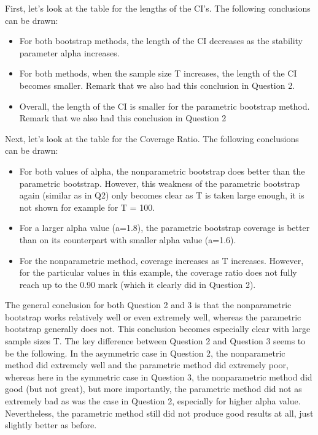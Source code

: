 \documentclass[12pt]{article}
\begin{document}
First, let's look at the table for the lengths of the CI's. The following conclusions can be drawn:
\begin{itemize}
  \item For both bootstrap methods, the length of the CI decreases as the stability parameter alpha increases.
  \item For both methods, when the sample size T increases, the length of the CI becomes smaller. Remark that we also had this conclusion in Question 2.
  \item Overall, the length of the CI is smaller for the parametric bootstrap method. Remark that we also had this conclusion in Question 2\newline
\end{itemize}

Next, let's look at the table for the Coverage Ratio. The following conclusions can be drawn:
\begin{itemize}
  \item For both values of alpha, the nonparametric bootstrap does better than the parametric bootstrap. However, this weakness of the parametric bootstrap again (similar as in Q2) only becomes clear as T is taken large enough, it is not shown for example for T = 100.
  \item For a larger alpha value (a=1.8), the parametric bootstrap coverage is better than on its counterpart with smaller alpha value (a=1.6).
  \item For the nonparametric method, coverage increases as T increases. However, for the particular values in this example, the coverage ratio does not fully reach up to the 0.90 mark (which it clearly did in Question 2). 
\end{itemize}

The general conclusion for both Question 2 and 3 is that the nonparametric bootstrap works relatively well or even extremely well, whereas the parametric bootstrap generally does not. This conclusion becomes especially clear with large sample sizes T.
The key difference between Question 2 and Question 3 seems to be the following. In the asymmetric case in Question 2, the nonparametric method did extremely well and the parametric method did extremely poor, whereas here in the symmetric case in Question 3, the nonparametric method did good (but not great), but more importantly, the parametric method did not as extremely bad as was the case in Question 2, especially for higher alpha value. Nevertheless, the parametric method still did not produce good results at all, just slightly better as before.
\end{document}
